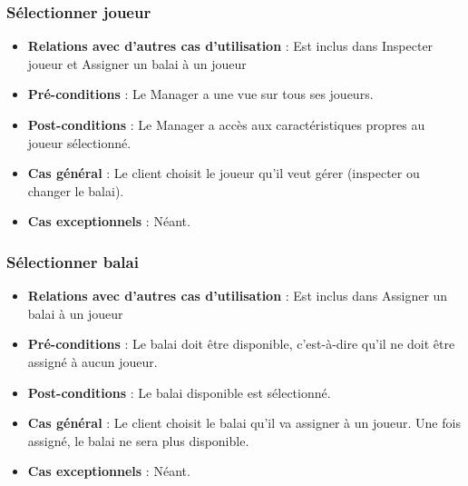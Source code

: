 \documentclass[a4paper,titlepage]{scrreprt}
\begin{document}
    \subsubsection{Sélectionner joueur}
      \begin{itemize}
        \item \textbf{Relations avec d'autres cas d'utilisation}  :  Est inclus dans Inspecter joueur et Assigner un balai à un joueur
        \item \textbf{Pré-conditions} : Le Manager a une vue sur tous ses joueurs.
        \item \textbf{Post-conditions} : Le Manager a accès aux caractéristiques propres au joueur sélectionné.
        \item \textbf{Cas général} : Le client choisit le joueur qu’il veut gérer (inspecter ou changer le balai).
        \item \textbf{Cas exceptionnels} : Néant.
      \end{itemize}
    \subsubsection{Sélectionner balai}
      \begin{itemize}
        \item \textbf{Relations avec d'autres cas d'utilisation}  : Est inclus dans Assigner un balai à un joueur
        \item \textbf{Pré-conditions} : Le balai doit être disponible, c’est-à-dire qu’il ne doit être assigné à aucun joueur.
        \item \textbf{Post-conditions} : Le balai disponible est sélectionné.
        \item \textbf{Cas général} : Le client choisit le balai qu’il va assigner à un joueur. Une fois assigné, le balai ne sera plus disponible.
        \item \textbf{Cas exceptionnels} : Néant.
      \end{itemize}
\end{document}
